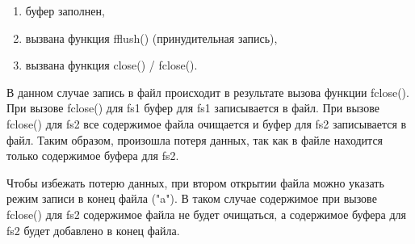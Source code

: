 \begin{enumerate}
	\item буфер заполнен,
	\item вызвана функция fflush() (принудительная запись),
	\item вызвана функция close() / fclose().
\end{enumerate}

В данном случае запись в файл происходит в результате вызова функции fclose().
При вызове fclose() для fs1 буфер для fs1 записывается в файл.
При вызове fclose() для fs2 все содержимое файла очищается и буфер для fs2 записывается в файл.
Таким образом, произошла потеря данных, так как в файле находится только содержимое буфера для fs2.

Чтобы избежать потерю данных, при втором открытии файла можно указать режим записи в конец файла ("a").
В таком случае содержимое при вызове fclose() для fs2 содержимое файла не будет очищаться, а содержимое буфера для fs2 будет добавлено в конец файла.

